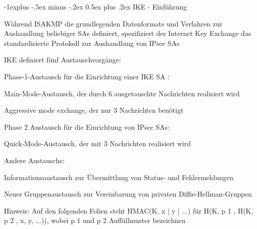 \documentclass[a4paper]{article}
\makeatletter
\renewcommand{\subsection}{\@startsection{subsection}{2}{0mm}%
 {-1explus -.5ex minus -.2ex}%
 {0.5ex plus .2ex}%
 {\normalfont\normalsize\bfseries}}
\makeatother
\begin{document}
\begin{multicols}{3}
\begin{itemize*}
            \subsection{IKE - Einführung}
            \begin{itemize*}
                  \item Während ISAKMP die grundlegenden Datenformate und Verfahren zur
                  Aushandlung beliebiger SAs definiert, spezifiziert der Internet Key
                  Exchange das standardisierte Protokoll zur Aushandlung von IPsec SAs
                  \item IKE definiert fünf Austauschvorgänge:
                  \begin{itemize*}
                        \item Phase-1-Austausch für die Einrichtung einer IKE SA :
                        \begin{itemize*} \item Main-Mode-Austausch, der durch 6 ausgetauschte Nachrichten realisiert wird \item Aggressive mode exchange, der nur 3 Nachrichten benötigt \end{itemize*}
                        \item Phase 2 Austausch für die Einrichtung von IPsec SAs:
                        \begin{itemize*} \item Quick-Mode-Austausch, der mit 3 Nachrichten realisiert wird \end{itemize*}
                        \item Andere Austausche:
                        \begin{itemize*} \item Informationsaustausch zur Übermittlung von Status- und Fehlermeldungen \item Neuer Gruppenaustausch zur Vereinbarung von privaten Diffie-Hellman-Gruppen \end{itemize*}
                  \end{itemize*}
                  \item Hinweis: Auf den folgenden Folien steht HMAC(K, x | y
                  | ...) für H(K, p 1 , H(K, p 2 , x, y, ...)), wobei p 1 und p
                  2 Auffüllmuster bezeichnen
            \end{itemize*}


\end{itemize*}
\end{multicols}
\end{document}
